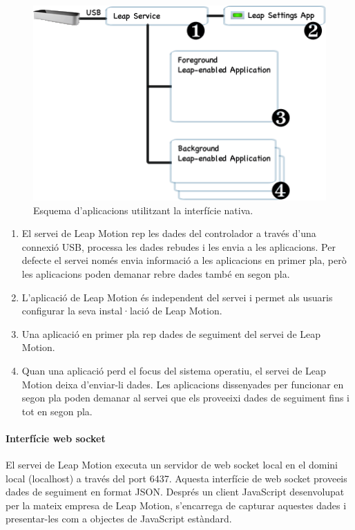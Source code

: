 \documentclass[12pt,a4paper,catalan]{article}
\begin{document}
	\begin{figure}[H]
		\includegraphics[width=\textwidth,keepaspectratio]{native-interface.png}
		\centering
		\caption{Esquema d'aplicacions utilitzant la interfície nativa.}
	\end{figure}
	\begin{enumerate}
		\item El servei de Leap Motion rep les dades del controlador a través d’una connexió USB, processa les dades rebudes i les envia a les aplicacions. Per defecte el servei només envia informació a les aplicacions en primer pla, però les aplicacions poden demanar rebre dades també en segon pla.
		\item L’aplicació de Leap Motion és independent del servei i permet als usuaris configurar la seva instal·lació de Leap Motion.
		\item Una aplicació en primer pla rep dades de seguiment del servei de Leap Motion.
		\item Quan una aplicació perd el focus del sistema operatiu, el servei de Leap Motion deixa d’enviar-li dades. Les aplicacions dissenyades per funcionar en segon pla poden demanar al servei que els proveeixi dades de seguiment fins i tot en segon pla.
	\end{enumerate}
	
	\paragraph{Interfície web socket}
	El servei de Leap Motion executa un servidor de web socket local en el domini local (localhost) a través del port 6437. Aquesta interfície de web socket proveeis dades de seguiment en format JSON. Després un client JavaScript desenvolupat per la mateix empresa de Leap Motion, s’encarrega de capturar aquestes dades i presentar-les com a objectes de JavaScript estàndard.
	
\end{document}
